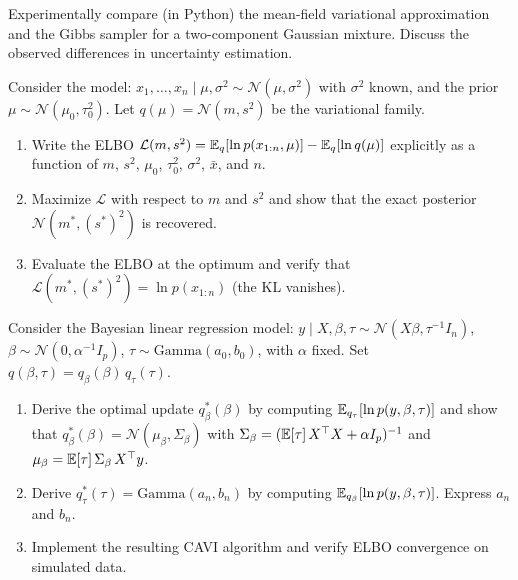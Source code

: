 \begin{exercise}
Experimentally compare (in Python) the mean-field variational approximation
and the Gibbs sampler for a two-component Gaussian mixture. Discuss the
observed differences in uncertainty estimation.
\end{exercise}

\begin{exercise}
Consider the model:
$x_1, \ldots, x_n \mid \mu, \sigma^2 \sim \mathcal{N}(\mu, \sigma^2)$
with $\sigma^2$ known, and the prior $\mu \sim \mathcal{N}(\mu_0, \tau_0^2)$.
Let $q(\mu) = \mathcal{N}(m, s^2)$ be the variational family.
\begin{enumerate}
  \item Write the ELBO $\mathcal{L}(m, s^2) =
        \mathbb{E}_q[\ln p(x_{1:n}, \mu)] - \mathbb{E}_q[\ln q(\mu)]$ explicitly as a
        function of $m$, $s^2$, $\mu_0$, $\tau_0^2$, $\sigma^2$,
        $\bar{x}$, and $n$.
  \item Maximize $\mathcal{L}$ with respect to $m$ and $s^2$ and show
        that the exact posterior $\mathcal{N}(m^*, (s^*)^2)$ is recovered.
  \item Evaluate the ELBO at the optimum and verify that
        $\mathcal{L}(m^*, (s^*)^2) = \ln p(x_{1:n})$ (the KL vanishes).
\end{enumerate}
\end{exercise}

\begin{exercise}
Consider the Bayesian linear regression model:
$y \mid X, \beta, \tau \sim \mathcal{N}(X\beta, \tau^{-1} I_n)$,
$\beta \sim \mathcal{N}(0, \alpha^{-1} I_p)$,
$\tau \sim \mathrm{Gamma}(a_0, b_0)$, with $\alpha$ fixed.
Set $q(\beta, \tau) = q_\beta(\beta)\,q_\tau(\tau)$.
\begin{enumerate}
  \item Derive the optimal update $q_\beta^*(\beta)$ by computing
        $\mathbb{E}_{q_\tau}[\ln p(y, \beta, \tau)]$ and show that
        $q_\beta^*(\beta) = \mathcal{N}(\mu_\beta, \Sigma_\beta)$
        with $\Sigma_\beta = (\mathbb{E}[\tau]\,X^\top X + \alpha I_p)^{-1}$
        and $\mu_\beta = \mathbb{E}[\tau]\,\Sigma_\beta\,X^\top y$.
  \item Derive $q_\tau^*(\tau) = \mathrm{Gamma}(a_n, b_n)$ by
        computing $\mathbb{E}_{q_\beta}[\ln p(y, \beta, \tau)]$.
        Express $a_n$ and $b_n$.
  \item Implement the resulting CAVI algorithm and verify ELBO
        convergence on simulated data.
\end{enumerate}
\end{exercise}

